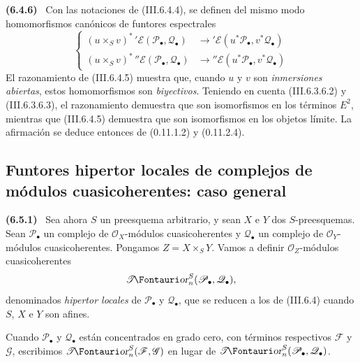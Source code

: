 \documentclass[10pt,oneside]{book}
\makeatletter
\newcommand{\sh}[1]{\mathscr{#1}}
\newcommand*{\ega@sheafop}[3]{\sh{#1}#2\textup{\kern-2.2pt{\Fontauri\slshape #3}}}
\newcommand{\shTor}{\ega@sheafop{T}{}{or}}
\newcommand{\sref}[2][]{\textup{(#2)}}
\newenvironment{env}[1][]{\par\medskip\noindent\textbf{(#1)}\ }{\par}
\makeatother
\begin{document}
\begin{env}[6.4.6]
\label{III.6.4.6}
Con las notaciones de \sref{III.6.4.4}, se definen del mismo modo
homomorfismos canónicos de funtores espectrales
\[
  \left\{
  \begin{aligned}
  (u\times_Sv)^*\,{}'\sh E(\sh P_\bullet,\sh Q_\bullet)
  &\longrightarrow
  {}'\sh E(u^*\sh P_\bullet,v^*\sh Q_\bullet)\\
  (u\times_Sv)^*\,{}''\sh E(\sh P_\bullet,\sh Q_\bullet)
  &\longrightarrow
  {}''\sh E(u^*\sh P_\bullet,v^*\sh Q_\bullet)
  \end{aligned}
  \right.
  \tag{6.4.6.1}\label{III.6.4.6.1}
\]
El razonamiento de \sref{III.6.4.5} muestra que, cuando $u$ y $v$
son \emph{inmersiones abiertas}, estos homomorfismos son \emph{biyectivos}.
Teniendo en cuenta \sref{III.6.3.6.2} y \sref{III.6.3.6.3}, el
razonamiento demuestra que son isomorfismos en los términos $E^2$,
mientras que \sref{III.6.4.5} demuestra que son isomorfismos en los
objetos límite. La afirmación se deduce entonces de
\sref[0]{0.11.1.2} y \sref[0]{0.11.2.4}.
\end{env}

\subsection{Funtores hipertor locales de complejos de módulos cuasicoherentes: caso general}
\label{subsection:III.6.5}

\begin{env}[6.5.1]
\label{III.6.5.1}
Sea ahora $S$ un preesquema arbitrario, y sean $X$ e $Y$ dos
$S$-preesquemas. Sean $\sh P_\bullet$ un complejo de
$\sh O_X$-módulos cuasicoherentes y $\sh Q_\bullet$ un complejo
de $\sh O_Y$-módulos cuasicoherentes. Pongamos $Z=X\times_SY$.
Vamos a definir $\sh O_Z$-módulos cuasicoherentes
\[
  \boldsymbol{\shTor}_n^S(\sh P_\bullet,\sh Q_\bullet),
\]
denominados \emph{hipertor locales} de $\sh P_\bullet$ y
$\sh Q_\bullet$, que se reducen a los de \sref{III.6.4} cuando
$S$, $X$ e $Y$ son afines.

Cuando $\sh P_\bullet$ y $\sh Q_\bullet$ están concentrados en
grado cero, con términos respectivos $\sh F$ y $\sh G$, escribimos
$\shTor_n^S(\sh F,\sh G)$ en lugar de
$\boldsymbol{\shTor}_n^S(\sh P_\bullet,\sh Q_\bullet)$.
\end{env}
\end{document}

